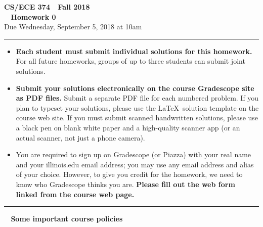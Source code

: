 \documentclass[11pt]{article}
\begin{document}
\thispagestyle{empty}

\begin{center}
\Large\textbf{CS/ECE 374 \,\decosix\,  Fall 2018}%
\\
\LARGE\textbf{\decothreeleft~ Homework 0 ~\decothreeright}%
\\[0.5ex]
\large Due Wednesday, September 5, 2018 at 10am
\end{center}

\bigskip
\hrule
\bigskip
\begin{itemize}

\item
\textbf{Each student must submit individual solutions for this homework.}   For all future homeworks, groups of up to three students can submit joint solutions.

\item \textbf{Submit your solutions electronically on the course
    Gradescope site as PDF files.}  Submit a separate PDF file for
  each numbered problem.  If you plan to typeset your solutions,
  please use the \LaTeX\ solution template on the course web site.  If
  you must submit scanned handwritten solutions, please use a black
  pen on blank white paper and a high-quality scanner app (or an
  actual scanner, not just a phone camera).

\item You are  required to sign up on Gradescope (or Piazza)
  with your real name and your illinois.edu email address; you may use
  any email address and alias of your choice.  However, to give you
  credit for the homework, we need to know who Gradescope thinks you
  are.  \textbf{Please fill out the web form linked from the course
    web page.}

\end{itemize}

\bigskip
\hrule
\bigskip

\begin{center}
\Large \textbf{\color{Red}\lefthand~
	Some important course policies
	~\righthand}\\
\end{center}
\end{document}
